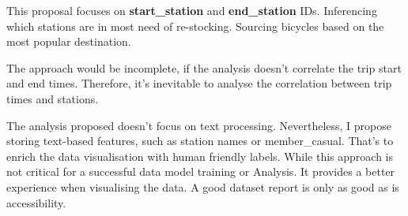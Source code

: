 \documentclass[12pt, a4paper]{article}
\begin{document}
    This proposal focuses on \textbf{start\_station} and \textbf{end\_station} IDs. Inferencing which stations are in most need of re-stocking. Sourcing bicycles based on the most popular destination.\newline

    The approach would be incomplete, if the analysis doesn't correlate the trip start and end times. Therefore, it's inevitable to analyse the correlation between trip times and stations.\newline

    The analysis proposed doesn't focus on text processing. Nevertheless, I propose storing text-based features, such as station names or member\_casual. That's to enrich the data visualisation with human friendly labels.\newline
    While this approach is not critical for a successful data model training or Analysis. It provides a better experience when visualising the data.\newline
    A good dataset report is only as good as is accessibility.
\end{document}
